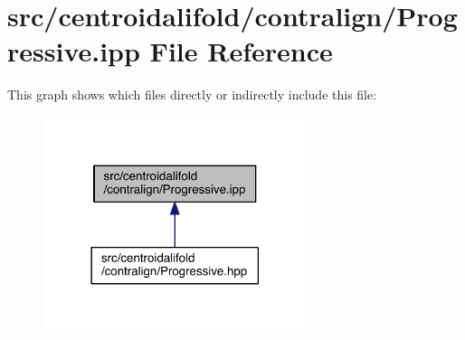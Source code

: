 \hypertarget{_progressive_8ipp}{\section{src/centroidalifold/contralign/\+Progressive.ipp File Reference}
\label{_progressive_8ipp}
}
This graph shows which files directly or indirectly include this file\+:
\nopagebreak
\begin{figure}[H]
\begin{center}
\leavevmode
\includegraphics[width=218pt]{_progressive_8ipp__dep__incl}
\end{center}
\end{figure}
